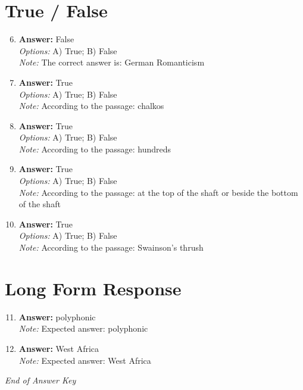 \documentclass[12pt]{article}
\begin{document}
\section*{True / False}
\begin{enumerate}[label=\arabic*.]
\setcounter{enumi}{5}
\item \textbf{Answer:} False
\\ \textit{Options:} A) True; B) False
\\ \textit{Note:} The correct answer is: German Romanticism
\item \textbf{Answer:} True
\\ \textit{Options:} A) True; B) False
\\ \textit{Note:} According to the passage: chalkos
\item \textbf{Answer:} True
\\ \textit{Options:} A) True; B) False
\\ \textit{Note:} According to the passage: hundreds
\item \textbf{Answer:} True
\\ \textit{Options:} A) True; B) False
\\ \textit{Note:} According to the passage: at the top of the shaft or beside the bottom of the shaft
\item \textbf{Answer:} True
\\ \textit{Options:} A) True; B) False
\\ \textit{Note:} According to the passage: Swainson's thrush
\end{enumerate}

\section*{Long Form Response}
\begin{enumerate}[label=\arabic*.]
\setcounter{enumi}{10}
\item \textbf{Answer:} polyphonic
\\ \textit{Note:} Expected answer: polyphonic
\item \textbf{Answer:} West Africa
\\ \textit{Note:} Expected answer: West Africa
\end{enumerate}

\vfill
\noindent\textit{End of Answer Key}
\end{document}

